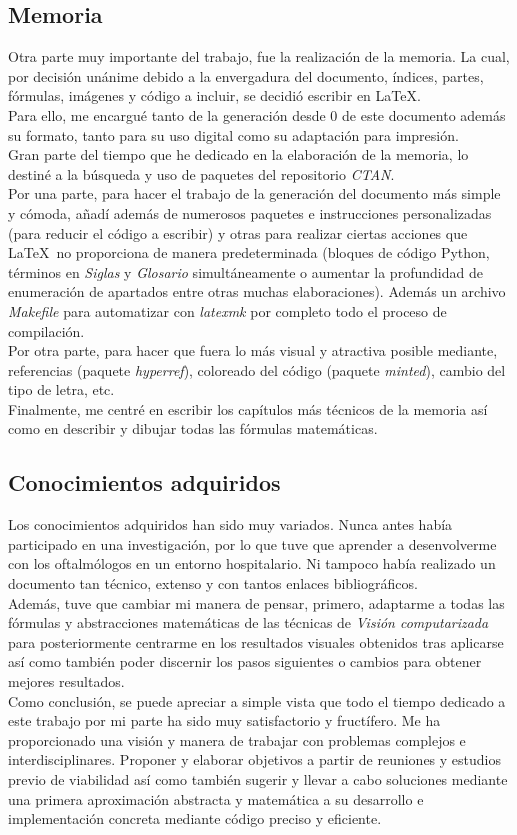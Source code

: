 \subsection{Memoria}
Otra parte muy importante del trabajo, fue la realización de la
memoria. La cual, por decisión unánime debido a la envergadura del
documento, índices, partes, fórmulas, imágenes y código a incluir, se
decidió escribir en \LaTeX.\\
Para ello, me encargué tanto de la generación desde $0$ de este
documento además su formato, tanto para su uso digital como su
adaptación para impresión.\\
Gran parte del tiempo que he dedicado en la elaboración de la memoria,
lo destiné a la búsqueda y uso de paquetes del repositorio
\emph{CTAN}.\\
Por una parte, para hacer el trabajo de la generación del documento
más simple y cómoda, añadí además de numerosos paquetes e
instrucciones personalizadas (para reducir el código a escribir) y
otras para realizar ciertas acciones que \LaTeX\ no proporciona de
manera predeterminada (bloques de código Python, términos en
\emph{Siglas} y \emph{Glosario} simultáneamente o aumentar la
profundidad de enumeración de apartados entre otras muchas
elaboraciones). Además un archivo \emph{Makefile} para automatizar con
\emph{latexmk} por completo todo el proceso de compilación.\\
Por otra parte, para hacer que fuera lo más visual y atractiva posible
mediante, referencias (paquete \emph{hyperref}), coloreado del código
(paquete \emph{minted}), cambio del tipo de letra, etc.\\
Finalmente, me centré en escribir los capítulos más técnicos de la
memoria así como en describir y dibujar todas las fórmulas
matemáticas.

\subsection{Conocimientos adquiridos}
Los conocimientos adquiridos han sido muy variados. Nunca antes había
participado en una investigación, por lo que tuve que aprender a
desenvolverme con los oftalmólogos en un entorno hospitalario. Ni
tampoco había realizado un documento tan técnico, extenso y con tantos
enlaces bibliográficos.\\
Además, tuve que cambiar mi manera de pensar, primero, adaptarme a
todas las fórmulas y abstracciones matemáticas de las técnicas de
\emph{Visión computarizada} para posteriormente centrarme en los
resultados visuales obtenidos tras aplicarse así como también poder
discernir los pasos siguientes o cambios para obtener mejores
resultados.\\
Como conclusión, se puede apreciar a simple vista que todo el tiempo
dedicado a este trabajo por mi parte ha sido muy satisfactorio y
fructífero. Me ha proporcionado una visión y manera de trabajar con
problemas complejos e interdisciplinares. Proponer y elaborar
objetivos a partir de reuniones y estudios previo de viabilidad así
como también sugerir y llevar a cabo soluciones mediante una primera
aproximación abstracta y matemática a su desarrollo e implementación
concreta mediante código preciso y eficiente.
